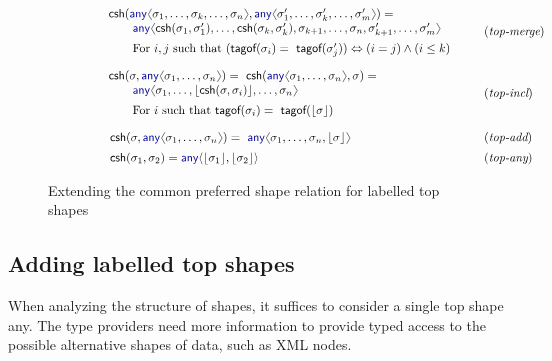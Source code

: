 \documentclass[10pt,nocopyrightspace]{sigplanconf}
\newcommand{\langl}{\begin{picture}(4.5,7)
\put(1.1,2.5){\rotatebox{60}{\line(1,0){5.5}}}
\put(1.1,2.5){\rotatebox{300}{\line(1,0){5.5}}}
\end{picture}}
\newcommand{\rangl}{\begin{picture}(4.5,7)
\put(.9,2.5){\rotatebox{120}{\line(1,0){5.5}}}
\put(.9,2.5){\rotatebox{240}{\line(1,0){5.5}}}
\end{picture}}
\newcommand{\kvd}[1]{\textnormal{\textcolor{kvdclr}{\sffamily #1}}}
\newcommand{\ident}[1]{\textnormal{\sffamily #1}}
\newcommand{\dropopt}[1]{\lfloor#1\rfloor}
\newcommand{\tytagof}{\ident{tagof}}
\begin{document}
\begin{figure*}
  \begin{equation*}
  \qquad\qquad
  \begin{array}{ll}
  \begin{array}{l}
    \ident{csh}(\kvd{any}\langl \sigma_1, \ldots, \sigma_k,  \ldots, \sigma_n\rangl,
      \kvd{any}\langl \sigma'_1, \ldots, \sigma'_k, \ldots, \sigma'_m\rangl) =\\
      \qquad \kvd{any}\langl \ident{csh}(\sigma_1, \sigma_1'), \ldots, \ident{csh}(\sigma_k, \sigma_k'),
        \sigma_{k+1}, \ldots, \sigma_{n}, \sigma'_{k+1}, \ldots, \sigma'_{m}\rangl \\[0.5em]
      \qquad \textnormal{For $i,j$ such that }(\tytagof(\sigma_i) = \tytagof(\sigma'_j)) \Leftrightarrow (i = j) \wedge (i \leq k)
  \end{array}\quad~
  &  (\emph{top-merge})
  \\[2.5em]
  \begin{array}{l}
    \ident{csh}(\sigma, \kvd{any}\langl\sigma_1, \ldots, \sigma_n\rangl) =
    \ident{csh}(\kvd{any}\langl\sigma_1, \ldots, \sigma_n\rangl, \sigma) = \\
    \qquad \kvd{any}\langl\sigma_1, \ldots, \dropopt{\ident{csh}(\sigma, \sigma_i)}, \ldots, \sigma_n\rangl\\[0.5em]
    \qquad \textnormal{For $i$ such that }\tytagof(\sigma_i) = \tytagof(\dropopt{\sigma})
  \end{array}
  &  (\emph{top-incl})
  \\[2.5em]
  ~\;\ident{csh}(\sigma, \kvd{any}\langl\sigma_1, \ldots, \sigma_n\rangl) =
   \kvd{any}\langl\sigma_1, \ldots, \sigma_n, \dropopt{\sigma}\rangl
   & (\emph{top-add})\\[0.5em]
  ~\;\ident{csh}(\sigma_1,\sigma_2) =
  \kvd{any}\langle\dropopt{\sigma_1}, \dropopt{\sigma_2}\rangle
  & (\emph{top-any})
 \end{array}
\end{equation*}

\caption{Extending the common preferred shape relation for labelled top shapes}
\label{fig:subtyping-cst-var}
\end{figure*}



\subsection{Adding labelled top shapes}
\label{sec:inference-vars}

When analyzing the structure of shapes, it suffices to consider a single top shape \kvd{any}.
The type providers need more information to provide typed access to the possible
alternative shapes of data, such as XML nodes.
\end{document}
